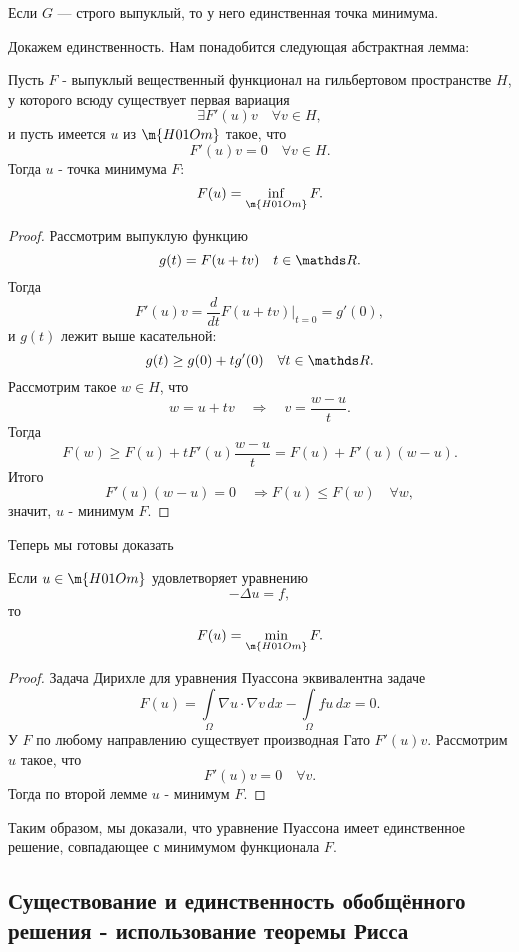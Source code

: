 \begin{exercise}
Если $G$ --- строго выпуклый, то у него единственная точка минимума.
\end{exercise}

Докажем единственность. Нам понадобится следующая абстрактная лемма:

\begin{lemma} Пусть $F$ - выпуклый вещественный функционал на гильбертовом пространстве $H$, у которого всюду существует первая вариация
$$ \exists F'(u) v \quad \forall v \in H,$$ и пусть имеется $u$ из $\m{H01Om}$ такое, что
$$ F'(u)v = 0 \quad \forall v \in H.$$
Тогда $u$ - точка минимума $F$:
$$ F(u) = \inf_{\m{H01Om}} F. $$
\end{lemma}
\begin{proof}
Рассмотрим выпуклую функцию
$$ g(t) = F(u+tv) \quad t\in \real.$$
Тогда
$$F'(u)v = \frac{d}{dt} F(u+tv)\Big\rvert_{t=0} = g'(0),$$
и $g(t)$ лежит выше касательной:
$$g(t) \geq g(0) + tg'(0) \quad \forall t \in \real.$$
Рассмотрим такое $w \in H$, что
$$ w = u + tv \quad \Rightarrow \quad v = \frac {w-u} {t}.$$
Тогда
$$ F(w) \geq F(u) + t F'(u) \frac{w-u}{t} = F(u) + F'(u)(w-u).$$
Итого
$$ F'(u)(w-u) = 0 \quad \Rightarrow F(u) \leq F(w) \quad \forall w,$$
значит, $u$ - минимум $F$.

\end{proof}
Теперь мы готовы доказать
\begin{theorem}
Если $u \in \m{H01Om}$ удовлетворяет уравнению
$$ - \Delta u = f,$$
то $$F(u) = \min_{\m{H01Om}} F.$$ 
\end{theorem}
\begin{proof}
Задача Дирихле для уравнения Пуассона эквивалентна задаче
$$F(u) = \int \limits_\Omega \nabla u \cdot \nabla v \, dx - \int \limits_\Omega fu \, dx = 0.$$
У $F$ по любому направлению существует производная Гато $F'(u)v$. Рассмотрим $u$ такое, что 
$$ F'(u) v = 0 \quad \forall v.$$
Тогда по второй лемме $u$ - минимум $F$.

\end{proof}

Таким образом, мы доказали, что уравнение Пуассона имеет единственное решение, совпадающее с минимумом функционала $F$.


\subsection{Существование и единственность обобщённого решения - использование теоремы Рисса}

